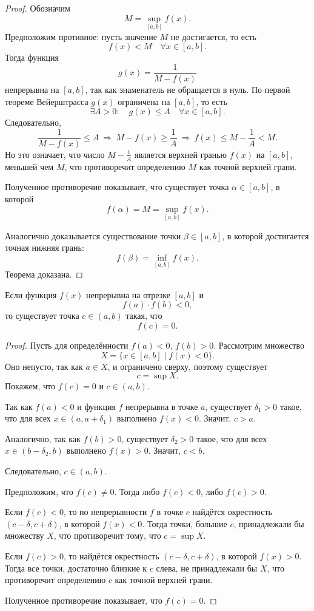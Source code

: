 \begin{proof}
Обозначим
\[
M=\sup_{[a,b]} f(x).
\]
Предположим противное: пусть значение \(M\) не достигается, то есть
\[
f(x)<M\quad \forall x\in[a,b].
\]
Тогда функция
\[
g(x)=\frac{1}{M-f(x)}
\]
непрерывна на \([a,b]\), так как знаменатель не обращается в нуль. По первой
теореме Вейерштрасса \(g(x)\) ограничена на \([a,b]\), то есть
\[
\exists A>0:\quad g(x)\le A\quad \forall x\in[a,b].
\]
Следовательно,
\[
\frac{1}{M-f(x)}\le A
\ \Longrightarrow\
M-f(x)\ge \frac{1}{A}
\ \Longrightarrow\
f(x)\le M-\frac{1}{A}<M.
\]
Но это означает, что число \(M-\frac{1}{A}\) является верхней гранью \(f(x)\) на
\([a,b]\), меньшей чем \(M\), что противоречит определению \(M\) как точной
верхней грани.

Полученное противоречие показывает, что существует точка \(\alpha\in[a,b]\), в
которой
\[
f(\alpha)=M=\sup_{[a,b]} f(x).
\]

Аналогично доказывается существование точки \(\beta\in[a,b]\), в которой
достигается точная нижняя грань:
\[
f(\beta)=\inf_{[a,b]} f(x).
\]
Теорема доказана.
\end{proof}



\begin{theorem}
Если функция \(f(x)\) непрерывна на отрезке \([a,b]\) и
\[
f(a)\cdot f(b)<0,
\]
то существует точка \(c\in(a,b)\) такая, что
\[
f(c)=0.
\]
\end{theorem}

\begin{proof}
Пусть для определённости \(f(a)<0\), \(f(b)>0\). Рассмотрим множество
\[
X=\{x\in[a,b]\mid f(x)<0\}.
\]
Оно непусто, так как \(a\in X\), и ограничено сверху, поэтому существует
\[
c=\sup X.
\]
Покажем, что \(f(c)=0\) и \(c\in(a,b)\).

Так как \(f(a)<0\) и функция \(f\) непрерывна в точке \(a\), существует
\(\delta_1>0\) такое, что для всех \(x\in(a,a+\delta_1)\) выполнено
\(f(x)<0\). Значит, \(c>a\).

Аналогично, так как \(f(b)>0\), существует \(\delta_2>0\) такое, что для всех
\(x\in(b-\delta_2,b)\) выполнено \(f(x)>0\). Значит, \(c<b\).

Следовательно, \(c\in(a,b)\).

Предположим, что \(f(c)\ne 0\). Тогда либо \(f(c)<0\), либо \(f(c)>0\).

Если \(f(c)<0\), то по непрерывности \(f\) в точке \(c\) найдётся окрестность
\((c-\delta,c+\delta)\), в которой \(f(x)<0\). Тогда точки, большие \(c\),
принадлежали бы множеству \(X\), что противоречит тому, что
\(c=\sup X\).

Если \(f(c)>0\), то найдётся окрестность \((c-\delta,c+\delta)\), в которой
\(f(x)>0\). Тогда все точки, достаточно близкие к \(c\) слева, не принадлежали
бы \(X\), что противоречит определению \(c\) как точной верхней грани.

Полученное противоречие показывает, что \(f(c)=0\).
\end{proof}

